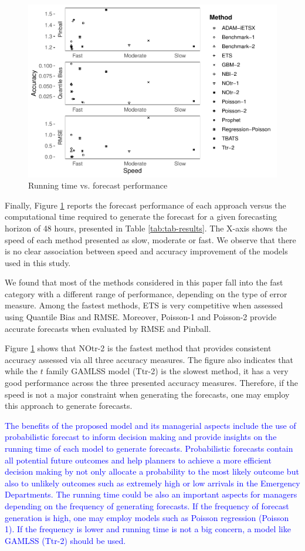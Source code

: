 \documentclass[]{elsarticle} %
\begin{document}
\begin{figure}[H]

{\centering \includegraphics[width=0.7\linewidth]{paper_files/figure-latex/time-accuracy-1} 

}

\caption{Running time vs. forecast performance}\label{fig:time-accuracy}
\end{figure}

Finally, Figure \ref{fig:time-accuracy} reports the forecast
performance of each approach versus the computational time required to
generate the forecast for a given forecasting horizon of 48 hours,
presented in Table \ref{tab:tab-results}. The X-axis shows the speed of
each method presented as slow, moderate or fast. We observe that there
is no clear association between speed and accuracy improvement of the
models used in this study.

We found that most of the methods considered in this paper fall into the
fast category with a different range of performance, depending on the
type of error measure. Among the fastest methods, ETS is very
competitive when assessed using Quantile Bias and RMSE. Moreover,
Poisson-1 and Poisson-2 provide accurate forecasts when evaluated by
RMSE and Pinball.

Figure \ref{fig:time-accuracy} shows that NOtr-2 is the fastest method
that provides consistent accuracy assessed via all three accuracy
measures. The figure also indicates that while the \(t\) family GAMLSS
model (Ttr-2) is the slowest method, it has a very good performance
across the three presented accuracy measures. Therefore, if the speed is
not a major constraint when generating the forecasts, one may employ
this approach to generate forecasts.

\textcolor{blue}{The benefits of the proposed model and its managerial aspects include
the use of probabilistic forecast to inform decision making and provide
insights on the running time of each model to generate forecasts. Probabilistic forecasts contain all potential future outcomes and help
planners to achieve a more efficient decision making by not only allocate a probability to the most likely outcome but also to unlikely
outcomes such as extremely high or low arrivals in the Emergency Departments. The running time could be also an important aspects for managers depending on the frequency of generating forecasts. If the frequency of forecast generation is high, one may employ models such as
Poisson regression (Poisson 1). If the frequency is lower and running time is not a big concern, a model like GAMLSS (Ttr-2) should be used.}
\end{document}
